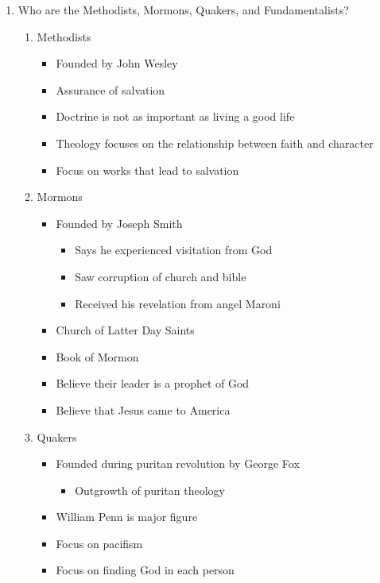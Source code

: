 \documentclass[8pt]{article}
\begin{document}
\begin{enumerate}
    \item Who are the Methodists, Mormons, Quakers, and Fundamentalists?
    \begin{enumerate}
        \item Methodists
        \begin{itemize}
            \item Founded by John Wesley
            \item Assurance of salvation
            \item Doctrine is not as important as living a good life
            \item Theology focuses on the relationship between faith and character
            \item Focus on works that lead to salvation
        \end{itemize}
        \item Mormons
        \begin{itemize}
            \item Founded by Joseph Smith
            \begin{itemize}
                \item Says he experienced visitation from God
                \item Saw corruption of church and bible
                \item Received his revelation from angel Maroni
            \end{itemize}
            \item Church of Latter Day Saints
            \item Book of Mormon
            \item Believe their leader is a prophet of God
            \item Believe that Jesus came to America
        \end{itemize}
        \item Quakers
        \begin{itemize}
            \item Founded during puritan revolution by George Fox
            \begin{itemize}
                \item Outgrowth of puritan theology
            \end{itemize}
            \item William Penn is major figure
            \item Focus on pacifism
            \item Focus on finding God in each person

\end{itemize}
\end{enumerate}
\end{enumerate}
\end{document}
